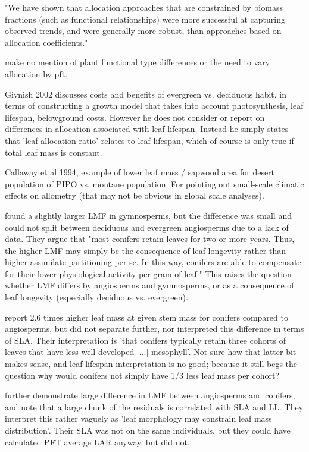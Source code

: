 \documentclass[a4paper]{article}
\begin{document}
\cite{de2014does} "We have shown that allocation approaches that are constrained by biomass fractions (such as functional relationships) were more successful at capturing observed trends, and were generally more robust, than approaches based on allocation coefficients."

\cite{friedlingstein_toward_1999} make no mention of plant functional type differences or the need to vary allocation by pft.

Givnish 2002 discusses costs and benefits of evergreen vs. deciduous habit, in terms of constructing a growth model that takes into account photosynthesis, leaf lifespan, belowground costs. However he does not consider or report on differences in allocation associated with leaf lifespan. Instead he simply states that 'leaf allocation ratio' relates to leaf lifespan, which of course is only true if total leaf mass is constant.

Callaway et al 1994, example of lower leaf mass / sapwood area for desert population of PIPO vs. montane population. For pointing out small-scale climatic effects on allometry (that may not be obvious in global scale analyses).

\cite{poorter_biomass_2012} found a slightly larger LMF in gymnosperms, but the difference was small and could not split between deciduous and evergreen angiosperms due to a lack of data. They argue that "most conifers retain leaves for two or more years. Thus, the higher LMF may simply be the consequence of leaf longevity rather than higher assimilate partitioning per se. In this way, conifers are able to compensate for their lower physiological activity per gram of leaf." This raises the question whether LMF differs by angiosperms and gymnosperms, or as a consequence of leaf longevity (especially deciduous vs. evergreen).

\cite{enquist_global_2002} report 2.6 times higher leaf mass at given stem mass for conifers compared to angiosperms, but did not separate further, nor interpreted this difference in terms of SLA. Their interpretation is 'that conifers typically retain three cohorts of leaves that have less well-developed [...] mesophyll'. Not sure how that latter bit makes sense, and leaf lifespan interpretation is no good; because it still begs the question why would conifers not simply have 1/3 less leaf mass per cohort? 

\cite{mccarthy_consistency_2007} further demonstrate large difference in LMF between angiosperms and conifers, and note that a large chunk of the residuals is correlated with SLA and LL. They interpret this rather vaguely as 'leaf morphology may constrain leaf mass distribution'. Their SLA was not on the same individuals, but they could have calculated PFT average LAR anyway, but did not.
\end{document}

